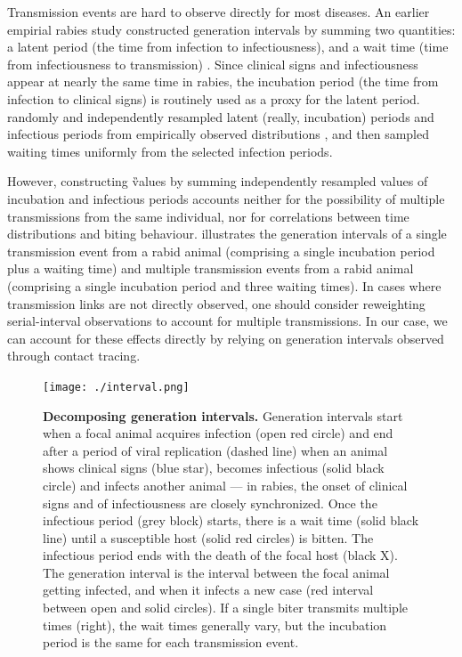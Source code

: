 Transmission events are hard to observe directly for most diseases. %
An earlier empirial rabies study constructed generation intervals by summing two quantities: a latent period (the time from infection to infectiousness), and a wait time (time from infectiousness to transmission) \citep{hampson2009transmission}.
Since clinical signs and infectiousness appear at nearly the same time in rabies, the incubation period (the time from infection to clinical signs) is routinely used as a proxy for the latent period.
\citeauthor{hampson2009transmission} randomly and independently resampled latent (really, incubation) periods and infectious periods from empirically observed distributions \citep{hampson2009transmission}, and then sampled waiting times uniformly from the selected infection periods.

However, constructing \G values by summing independently resampled values of incubation and infectious periods accounts neither for the possibility of multiple transmissions from the same individual, nor for correlations between time distributions and biting behaviour.
 illustrates the generation intervals of a single transmission event from a rabid animal (comprising a single incubation period plus a waiting time) and multiple transmission events from a rabid animal (comprising a single incubation period and three waiting times).
In cases where transmission links are not directly observed, one should consider reweighting serial-interval observations to account for  multiple transmissions. In our case, we can account for these effects directly by relying on generation intervals observed through contact tracing.

\begin{center}
\begin{figure}[ht!]
\texttt{[image: ./interval.png]}
\caption{\textbf{Decomposing generation intervals.}
Generation intervals start when a focal animal acquires infection (open red circle) and end after a period of viral replication (dashed line) when an animal shows clinical signs (blue star), becomes infectious (solid black circle) and infects another animal --- in rabies, the onset of clinical signs and of infectiousness are closely synchronized.
Once the infectious period (grey block) starts, there is a wait time (solid black line) until a susceptible host (solid red circles) is bitten. The infectious period ends with the death of the focal host (black X).
The generation interval is the interval between the focal animal getting infected, and when it infects a new case (red interval between open and solid circles). If a single biter transmits multiple times (right), the wait times generally vary, but the incubation period is the same for each transmission event.}
\end{figure}
\end{center}

